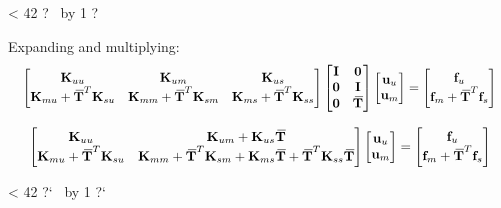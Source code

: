 \documentclass[10pt,b5paper,titlepage]{book}
\newcommand{\m}{\mathbf}
\newcommand{\closure}[2][3]{%
{}\mkern#1mu\overline{\mkern-#1mu#2}}
\newcommand{\repeatit}[3][10]{%
    \myloopcounter1%
    \loop\ifnum\myloopcounter < #1
    #2#3%
    \advance\myloopcounter by 1%
    \repeat%
    #2%
}
\newenvironment{qbox}
{
\begin{center}
    \repeatit[42]{?}{\ }
\end{center}
}
{
\begin{center}
    \repeatit[42]{?`}{\ }
\end{center}
}
\begin{document}
\begin{qbox}
    Expanding and multiplying:
    \begin{equation}
        \scalebox{0.92}{
        $ \begin{bmatrix}
            \m{K}_{uu} & \m{K}_{um} & \m{K}_{us} \\
            \m{K}_{mu} + \m{\closure{T}}^T \m{K}_{su} &
            \m{K}_{mm} + \m{\closure{T}}^T \m{K}_{sm} &
            \m{K}_{ms} + \m{\closure{T}}^T \m{K}_{ss} \\
        \end{bmatrix}
        \begin{bmatrix}
            \m{I} & \m{0} \\
            \m{0} & \m{I} \\
            \m{0} & \m{\closure{T}} \\
        \end{bmatrix}
        \begin{bmatrix}
            \m{u}_u \\
            \m{u}_m \\
        \end{bmatrix}
        = \begin{bmatrix}
            \m{f}_u \\
            \m{f}_m + \m{\closure{T}}^T \m{f}_s \\
        \end{bmatrix} $
        }
    \end{equation}

    \begin{equation}
        \scalebox{0.95}{
        $ \begin{bmatrix}
            \m{K}_{uu} & \m{K}_{um} + \m{K}_{us} \m{\closure{T}} \\
            \m{K}_{mu} + \m{\closure{T}}^T \m{K}_{su} &
            \m{K}_{mm} + \m{\closure{T}}^T \m{K}_{sm} +
            \m{K}_{ms} \m{\closure{T}} + \m{\closure{T}}^T \m{K}_{ss} \m{\closure{T}} \\
        \end{bmatrix}
        \begin{bmatrix}
            \m{u}_u \\
            \m{u}_m \\
        \end{bmatrix}
        = \begin{bmatrix}
            \m{f}_u \\
            \m{f}_m + \m{\closure{T}}^T \m{f}_s \\
        \end{bmatrix} $
        }
    \end{equation}


\end{qbox}
\end{document}
